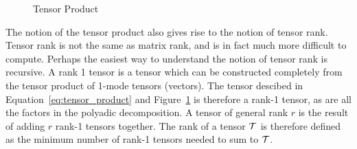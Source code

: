 \documentclass[../ut-dissertation.tex]{subfiles}
\begin{document}
\begin{figure}[p]%
  \centering
  \qquad
  \qquad
  \caption{Tensor Product} \label{fig:tensor_product}
\end{figure}

The notion of the tensor product also gives rise to the notion of
tensor rank.  Tensor rank is not the same as matrix rank, and is in
fact much more difficult to compute.  Perhaps the easiest way to
understand the notion of tensor rank is recursive.  A rank 1 tensor is
a tensor which can be constructed completely from the tensor product
of 1-mode tensors (vectors).  The tensor descibed in
Equation~\ref{eq:tensor_product} and
Figure~\ref{fig:tensor_product} is therefore a rank-1 tensor, as are
all the factors in the polyadic decomposition.  A tensor of general
rank $r$ is the result of adding $r$ rank-1 tensors together. The rank
of a tensor $\mathcal{T}$ is therefore defined as the minimum number of
rank-1 tensors needed to sum to $\mathcal{T}$.
\end{document}
